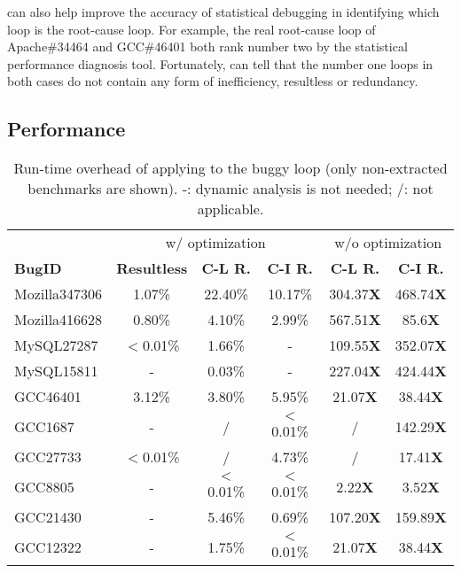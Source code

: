 \Tool can also help improve the accuracy of statistical debugging in
identifying which loop is the root-cause loop.
For example, the real root-cause loop of Apache\#34464 and GCC\#46401 both
rank number two by the statistical performance diagnosis tool.
Fortunately,
\Tool can tell that the number one loops in both cases do not contain
any form of inefficiency, resultless or redundancy. 

\subsection{Performance}
\label{sec:result_perf}

\begin{table}
  \centering
  \scriptsize
  \newcommand{\Yes}[1]{\checkmark{}$_#1$}
  \newcommand{\No}[0]{-}
  \begin{tabular}{lccccc}
    \toprule
	    & \multicolumn{3}{c}{\Tool w/ optimization} & \multicolumn{2}{c}{w/o optimization} \\
     \cmidrule(lr){2-4}
     \cmidrule(lr){5-6}
     {\bf BugID}  & {\bf Resultless}  &  {\bf C-L R. } & {\bf C-I R. }  & {\bf C-L R.}  & {\bf C-I R. } \\
    \midrule
    Mozilla347306 &  1.07\%           &  22.40\%       &  10.17\%       & 304.37{\bf X} & 468.74{\bf X} \\ 
    Mozilla416628 &  0.80\%           &  4.10\%        &  2.99\%        & 567.51{\bf X} & 85.6{\bf X} \\
    \midrule
     MySQL27287   & $<$0.01\%           &   1.66\%       &   -            & 109.55{\bf X} & 352.07{\bf X} \\
     MySQL15811   &  -                &   0.03\%       &   -            & 227.04{\bf X} & 424.44{\bf X} \\
    \midrule
      GCC46401    & 3.12\%         & 3.80\%            &  5.95\%        & 21.07{\bf X}  & 38.44{\bf X}\\ 
      GCC1687     & -              & /                 &  $<$0.01\%       &   /           & 142.29{\bf X} \\
      GCC27733    & $<$0.01\%        & /                 &  4.73\%        &   /           & 17.41{\bf X}     \\
      GCC8805     & -              & $<$0.01\%           & $<$0.01\%        & 2.22{\bf X}   &  3.52{\bf X}\\
      GCC21430    & -              & 5.46\%            &   0.69\%       & 107.20{\bf X} & 159.89{\bf X} \\
      GCC12322    & -              & 1.75\%            &  $<$0.01\%       & 21.07{\bf X}  & 38.44{\bf X} \\
   \bottomrule
   \end{tabular}
  \caption{Run-time overhead of applying \Tool to the buggy loop
    (only non-extracted benchmarks are shown). 
  -: dynamic analysis is not needed;
  /: not applicable.}
  \label{tab:performance}
\end{table}


